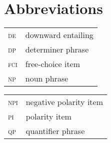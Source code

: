 \documentclass[output=paper,colorlinks,citecolor=brown,
]{langscibook}
\begin{document}
\section*{Abbreviations}
\begin{tabularx}{.5\textwidth}[t]{@{}lQ}
\textsc{de} & downward entailing\\
\textsc{dp} & determiner phrase\\
\textsc{fci} & free-choice item\\
\textsc{np} & noun phrase\\
\end{tabularx}\begin{tabularx}{.5\textwidth}[t]{lQ@{}}
\textsc{npi} & negative polarity item\\
\textsc{pi} & polarity item\\
\textsc{qp} & quantifier phrase\\
\end{tabularx}



\printbibliography[heading=subbibliography,notkeyword=this]
\end{document}
